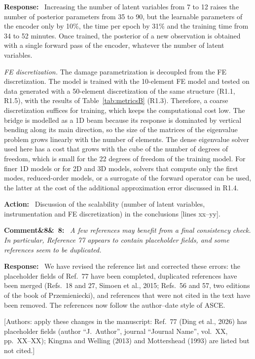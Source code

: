 \documentclass[11pt]{article}
\newenvironment{rcomment}[1]{\par\bigskip\noindent\textbf{Comment\ifx&#1&\else\ #1\fi:}\ \itshape}{\par}
\newenvironment{response}{\par\smallskip\noindent\color{resp}\textbf{Response:}\ }{\par}
\newenvironment{action}{\par\smallskip\noindent\color{resp}\textbf{Action:}\ }{\par}
\newcommand{\authornote}[1]{\textcolor{note}{\textsf{[Authors: #1]}}}
\newcommand{\tbd}[1]{\textcolor{note}{\textsf{[#1]}}}
\newcommand{\lines}[1]{\tbd{lines #1}}
\begin{document}
\begin{response}
Increasing the number of latent variables from 7 to 12 raises the number of posterior parameters from 35 to 90, but the
learnable parameters of the encoder only by 10\%, the time per epoch by 31\% and the training time from 34 to 52
minutes. Once trained, the posterior of a new observation is obtained with a single forward pass of the encoder,
whatever the number of latent variables.

\textit{FE discretization.} The damage parametrization is decoupled from the FE discretization. The model is trained
with the 10-element FE model and tested on data generated with a 50-element discretization of the same structure (R1.1,
R1.5), with the results of Table~\ref{tab:metricsB} (R1.3). Therefore, a coarse discretization suffices for training,
which keeps the computational cost low. The bridge is modelled as a 1D beam because its response is dominated by
vertical bending along its main direction, so the size of the matrices of the eigenvalue problem grows linearly with
the number of elements. The dense eigenvalue solver used here has a cost that grows with the cube of the number of
degrees of freedom, which is small for the 22 degrees of freedom of the training model. For finer 1D models or for
2D and 3D models, solvers that compute only the first modes, reduced-order models, or a surrogate of the forward
operator can be used, the latter at the cost of the additional approximation error discussed in R1.4.
\end{response}

\begin{action}
Discussion of the scalability (number of latent variables, instrumentation and FE discretization) in the conclusions
\lines{xx--yy}.
\end{action}

\begin{rcomment}{8}
A few references may benefit from a final consistency check. In particular, Reference 77 appears to contain placeholder fields, and some references seem to be duplicated.
\end{rcomment}

\begin{response}
We have revised the reference list and corrected these errors: the placeholder fields of Ref.~77 have been completed,
duplicated references have been merged (Refs.~18 and 27, Simoen et al., 2015; Refs.~56 and 57, two editions of the book
of Przemieniecki), and references that were not cited in the text have been removed. The references now follow the
author--date style of ASCE.
\end{response}
\authornote{apply these changes in the manuscript: Ref.~77 (Ding et al., 2026) has placeholder fields (author ``J.~Author'',
journal ``Journal Name'', vol.~XX, pp.~XX--XX); Kingma and Welling (2013) and Mottershead (1993) are listed but not
cited.}
\end{document}
